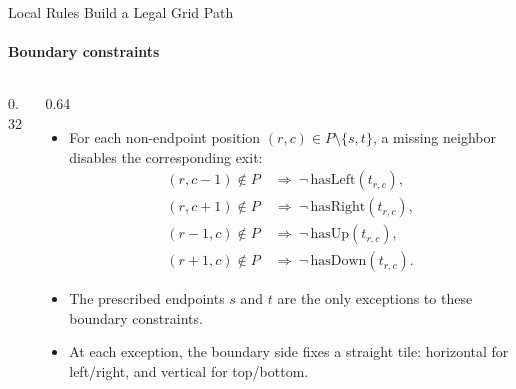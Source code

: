 \documentclass[aspectratio=169,10pt]{beamer}
\begin{document}
\begin{frame}{Local Rules Build a Legal Grid Path}
  \framesubtitle{Boundary constraints}
  \begin{columns}[c,totalwidth=\textwidth]
    \begin{column}{0.32\textwidth}
      \centering
      
    \end{column}
    \begin{column}{0.64\textwidth}
      \begin{itemize}
        \item For each non-endpoint position
          \((r,c)\in P\setminus\{s,t\}\), a missing neighbor disables
          the corresponding exit:
          \[
            \begin{aligned}
              (r,c-1)\notin P
              &\ \Longrightarrow
              \ \neg\,\mathrm{hasLeft}(t_{r,c}),
              \\[0.25em]
              (r,c+1)\notin P
              &\ \Longrightarrow
              \ \neg\,\mathrm{hasRight}(t_{r,c}),
              \\[0.25em]
              (r-1,c)\notin P
              &\ \Longrightarrow
              \ \neg\,\mathrm{hasUp}(t_{r,c}),
              \\[0.25em]
              (r+1,c)\notin P
              &\ \Longrightarrow
              \ \neg\,\mathrm{hasDown}(t_{r,c}).
            \end{aligned}
          \]
        \item The prescribed endpoints \(s\) and \(t\) are the only
          exceptions to these boundary constraints.
        \item At each exception, the boundary side fixes a straight tile:
          horizontal for left/right, and vertical for top/bottom.
      \end{itemize}
    \end{column}
  \end{columns}
\end{frame}
\end{document}
